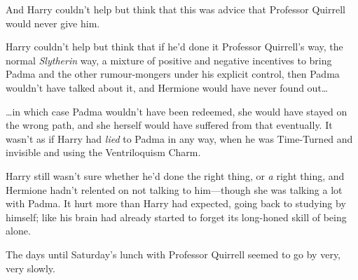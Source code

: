 And Harry couldn’t help but think that this was advice that Professor Quirrell would never give him.

Harry couldn’t help but think that if he’d done it Professor Quirrell’s way, the normal \emph{Slytherin} way, a mixture of positive and negative incentives to bring Padma and the other rumour-mongers under his explicit control, then Padma wouldn’t have talked about it, and Hermione would have never found out…

…in which case Padma wouldn’t have been redeemed, she would have stayed on the wrong path, and she herself would have suffered from that eventually. It wasn’t as if Harry had \emph{lied} to Padma in any way, when he was Time-Turned and invisible and using the Ventriloquism Charm.

Harry still wasn’t sure whether he’d done the right thing, or \emph{a} right thing, and Hermione hadn’t relented on not talking to him—though she was talking a lot with Padma. It hurt more than Harry had expected, going back to studying by himself; like his brain had already started to forget its long-honed skill of being alone.

The days until Saturday’s lunch with Professor Quirrell seemed to go by very, very slowly.

